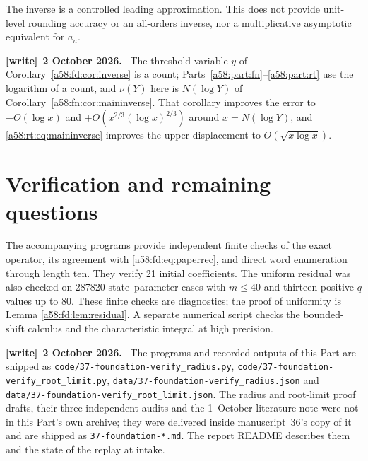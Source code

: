 \documentclass[11pt,letterpaper]{article}
\newcommand{\file}[1]{\nolinkurl{#1}}
\theoremstyle{remark}
\newenvironment{writenote}[1][]{\par\smallskip\begingroup\small
 \noindent\textbf{[write]}\if\relax\detokenize{#1}\relax\else~\textbf{#1.}\fi\ }%
 {\par\endgroup\smallskip}
\begin{document}
The inverse is a controlled leading approximation. This does not provide unit-level rounding accuracy or an all-orders inverse, nor a multiplicative asymptotic equivalent for $a_n$.
\begin{writenote}[2 October 2026]
The threshold variable $y$ of Corollary~\ref{a58:fd:cor:inverse} is a count; Parts~\ref{a58:part:fn}--\ref{a58:part:rt} use the logarithm of a count, and $\nu(Y)$ here is $N(\log Y)$ of Corollary~\ref{a58:fn:cor:maininverse}. That corollary improves the error to $-O(\log x)$ and $+O(x^{2/3}(\log x)^{2/3})$ around $x=N(\log Y)$, and \eqref{a58:rt:eq:maininverse} improves the upper displacement to $O(\sqrt{x\log x})$.
\end{writenote}

\section{Verification and remaining questions}\label{a58:fd:sec:verification}
The accompanying programs provide independent finite checks of the exact operator, its agreement with \eqref{a58:fd:eq:paperrec}, and direct word enumeration through length ten. They verify 21 initial coefficients. The uniform residual was also checked on 287820 state--parameter cases with $m\le40$ and thirteen positive $q$ values up to 80. These finite checks are diagnostics; the proof of uniformity is Lemma \ref{a58:fd:lem:residual}. A separate numerical script checks the bounded-shift calculus and the characteristic integral at high precision.
\begin{writenote}[2 October 2026]
The programs and recorded outputs of this Part are shipped as \file{code/37-foundation-verify_radius.py}, \file{code/37-foundation-verify_root_limit.py}, \file{data/37-foundation-verify_radius.json} and \file{data/37-foundation-verify_root_limit.json}. The radius and root-limit proof drafts, their three independent audits and the 1~October literature note were not in this Part's own archive; they were delivered inside manuscript~36's copy of it and are shipped as \file{37-foundation-*.md}. The report README describes them and the state of the replay at intake.
\end{writenote}
\end{document}
